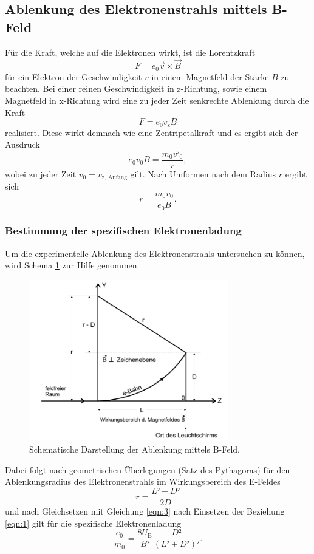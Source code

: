 \subsection{Ablenkung des Elektronenstrahls mittels B-Feld}
Für die Kraft, welche auf die Elektronen wirkt, ist die Lorentzkraft
\begin{equation}
  F = e_0 \vec{v} \times \vec{B}
\end{equation}
für ein Elektron der Geschwindigkeit $v$ in einem Magnetfeld der Stärke $B$ zu beachten.
Bei einer reinen Geschwindigkeit in z-Richtung, sowie einem Magnetfeld in x-Richtung wird eine zu jeder Zeit senkrechte Ablenkung durch die Kraft
\begin{equation}
  F = e_0 v_{\text{z}} B
\end{equation}
realisiert.
Diese wirkt demnach wie eine Zentripetalkraft und es ergibt sich der Ausdruck
\begin{equation}
  e_0 v_0 B = \frac{m_0 v²_0}{r},
\end{equation}
wobei zu jeder Zeit $v_0 = v_{\text{z, Anfang}}$ gilt.
Nach Umformen nach dem Radius $r$ ergibt sich
\begin{equation}
  r = \frac{m_0 v_0}{e_0 B}. \label{eqn:3}
\end{equation}
\clearpage

\subsubsection{Bestimmung der spezifischen Elektronenladung}
Um die experimentelle Ablenkung des Elektronenstrahls untersuchen zu können, wird Schema \ref{fig:2} zur Hilfe genommen.
\begin{figure}
  \centering
  \includegraphics[height=7cm]{ressources/schema2.png}
  \caption{Schematische Darstellung der Ablenkung mittels B-Feld. \cite{skript2}}
  \label{fig:2}
\end{figure}
Dabei folgt nach geometrischen Überlegungen (Satz des Pythagoras) für den Ablenkungsradius des Elektronenstrahls im Wirkungsbereich des E-Feldes
\begin{equation}
  r = \frac{L²+D²}{2D}
\end{equation}
und nach Gleichsetzen mit Gleichung \eqref{eqn:3} nach Einsetzen der Beziehung \eqref{eqn:1} gilt für die spezifische Elektronenladung
\begin{equation}
  \frac{e_0}{m_0} = \frac{8 U_{\text{B}}}{B²} \frac{D²}{(L²+D²)²}. \label{eqn:4}
\end{equation}


